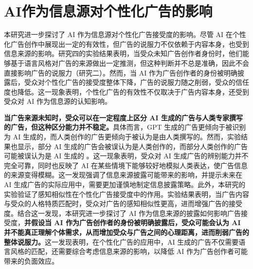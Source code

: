 \section{AI作为信息源对个性化广告的影响}
本研究进一步探讨了 AI 作为信息源对个性化广告接受度的影响。尽管 AI 在个性化广告创作中展现出一定的有效性，但广告的说服力不仅依赖于内容本身，也受到信息来源的影响。研究四的实验结果表明，当受众未知广告创作者身份时，他们能够基于语言风格对广告的来源做出一定推测，但这种判断并不总是准确，因此不会直接影响广告的说服力（研究二）。然而，当 AI 作为广告创作者的身份被明确披露后，受众对个性化广告的接受度整体下降，广告的说服力随之削弱，受众的信任度也降低。这一现象表明，个性化广告的有效性不仅取决于广告内容本身，还受到受众对 AI 作为信息源的认知影响。


\textbf{当广告来源未知时，受众可以在一定程度上区分 AI 生成的广告与人类专家撰写的广告，但这种区分能力并不稳定。}具体而言，GPT 生成的广告更倾向于被识别为 AI 生成的，而人类创作的广告更倾向于被认为是由人类撰写的。然而，实验结果也显示，部分 AI 生成的广告会被误认为是人类创作的，而部分人类创作的广告可能被误认为是 AI 生成的 \citep{chaka2024reviewing}。这一现象表明，受众对 AI 生成广告的辨别能力并不完全可靠，同时也反映了 AI 在某些情境下能够较好地模拟人类表达，使广告信息的来源变得模糊。这一发现强调了信息来源披露可能带来的影响，并提示未来在 AI 生成广告的实际应用中，需要更加谨慎地制定信息披露策略。此外，本研究的实验验证了感知相似性在个性化广告接受度中的作用。实验结果表明，当广告内容与受众的人格特质匹配时，受众对广告的感知相似性更高，进而增强广告的接受度。结合这一发现，本研究进一步探讨了 AI 作为信息来源的披露如何影响广告接受度，\textbf{并假设当 AI 作为广告创作者的身份被明确披露后，受众可能会认为 AI 并不能真正理解个体需求，从而增加受众与广告之间的心理距离\citep{kim2020artificial, ahn2021ai}，进而削弱广告的整体说服力。}这一发现表明，在个性化广告的应用中，AI 生成的广告不仅需要语言风格的匹配，还需要综合考虑信息来源的影响，以降低 AI 作为广告创作者可能带来的负面效应。


